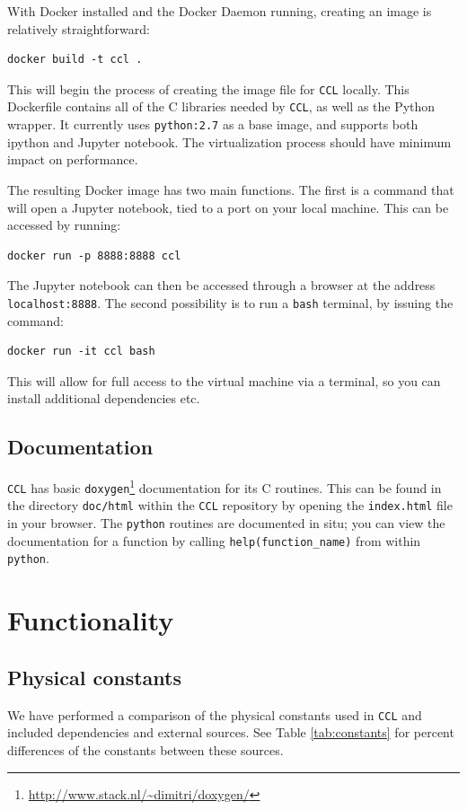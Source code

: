 \documentclass[\docopts]{\docclass}
\newcommand{\ccl}{{\tt CCL}\xspace}
\begin{document}
With Docker installed and the Docker Daemon running, creating an image is relatively straightforward:
\begin{verbatim}
docker build -t ccl .
\end{verbatim}
This will begin the process of creating the image file for \ccl locally. This Dockerfile contains all of the C libraries needed by \ccl, as well as the Python wrapper. It currently uses {\tt python:2.7} as a base image, and supports both ipython and Jupyter notebook. The virtualization process should have minimum impact on performance.

The resulting Docker image has two main functions. The first is a command that will open a Jupyter notebook, tied to a port on your local machine. This can be accessed by running:
\begin{verbatim}
docker run -p 8888:8888 ccl
\end{verbatim}
The Jupyter notebook can then be accessed through a browser at the address {\tt localhost:8888}. The second possibility is to run a {\tt bash} terminal, by issuing the command:
\begin{verbatim}
docker run -it ccl bash
\end{verbatim}
This will allow for full access to the virtual machine via a terminal, so you can install additional dependencies etc.

\subsection{Documentation}
\label{sec:doc}

\ccl has basic {\tt doxygen}\footnote{\url{http://www.stack.nl/~dimitri/doxygen/}} documentation for its C routines. This can be found in the directory {\tt doc/html} within the \ccl repository by opening the {\tt index.html} file in your browser. The {\tt python} routines are documented in situ; you can view the documentation for a function by calling {\tt help(function\_name)} from within {\tt python}.

\section{Functionality}
\label{sec:func}

\subsection{Physical constants}

\label{sec:constants}
We have performed a comparison of the physical constants used in \ccl and included dependencies and external sources. See Table \ref{tab:constants} for percent differences of the constants between these sources.
\end{document}
